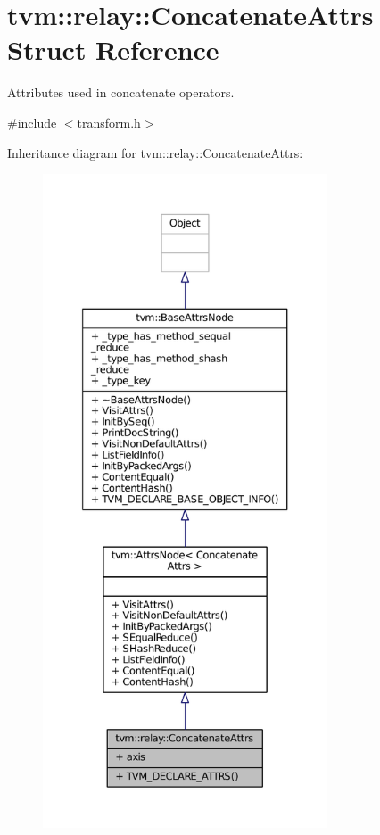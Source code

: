\hypertarget{structtvm_1_1relay_1_1ConcatenateAttrs}{}\section{tvm\+:\+:relay\+:\+:Concatenate\+Attrs Struct Reference}
\label{structtvm_1_1relay_1_1ConcatenateAttrs}


Attributes used in concatenate operators.  




{\ttfamily \#include $<$transform.\+h$>$}



Inheritance diagram for tvm\+:\+:relay\+:\+:Concatenate\+Attrs\+:
\nopagebreak
\begin{figure}[H]
\begin{center}
\leavevmode
\includegraphics[height=550pt]{structtvm_1_1relay_1_1ConcatenateAttrs__inherit__graph}
\end{center}
\end{figure}


